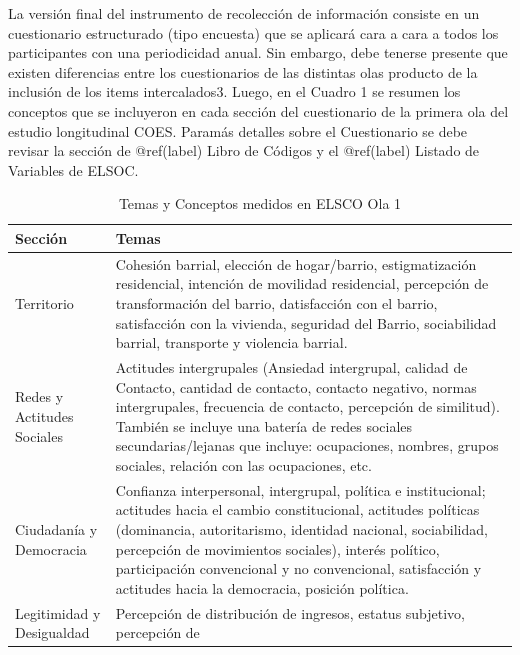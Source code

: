 \documentclass[
]{book}
\begin{document}
La versión final del instrumento de recolección de información consiste
en un cuestionario estructurado (tipo encuesta) que se aplicará cara a
cara a todos los participantes con una periodicidad anual. Sin embargo,
debe tenerse presente que existen diferencias entre los cuestionarios de
las distintas olas producto de la inclusión de los items intercalados3.
Luego, en el Cuadro 1 se resumen los conceptos que se incluyeron en cada
sección del cuestionario de la primera ola del estudio longitudinal
COES. Paramás detalles sobre el Cuestionario se debe revisar la sección
de @ref(label) Libro de Códigos y el @ref(label) Listado de Variables de
ELSOC.

\begin{landscape}\begin{table}

\caption{\label{tab:unnamed-chunk-1}\label{tab:apaisada}Temas y Conceptos medidos en ELSCO Ola 1}
\centering
\begin{tabular}[t]{>{\raggedright\arraybackslash}p{2cm}>{\raggedright\arraybackslash}p{8cm}}
\toprule
Sección & Temas\\
\midrule
Territorio & Cohesión barrial, elección de hogar/barrio, estigmatización residencial,   
                          intención de movilidad residencial, percepción de transformación del
                          barrio, datisfacción con el barrio, satisfacción con la vivienda, seguridad
                          del Barrio, sociabilidad barrial, transporte y violencia barrial.\\
Redes y Actitudes Sociales & Actitudes intergrupales (Ansiedad intergrupal, calidad de Contacto, cantidad de contacto,
            contacto negativo, normas intergrupales, frecuencia
            de contacto, percepción de similitud). También se incluye una batería de
            redes sociales secundarias/lejanas que incluye: ocupaciones, nombres, grupos sociales,
            relación con las ocupaciones, etc.\\
Ciudadanía y Democracia & Confianza interpersonal, intergrupal, política e institucional; actitudes hacia el cambio
          constitucional, actitudes políticas (dominancia, autoritarismo,
          identidad nacional, sociabilidad, percepción de movimientos
          sociales), interés político, participación convencional y no convencional,
          satisfacción y actitudes hacia la democracia, posición política.\\
Legitimidad y Desigualdad & Percepción de distribución de ingresos, estatus subjetivo, percepción de

\end{tabular}
\end{table}
\end{landscape}
\end{document}

